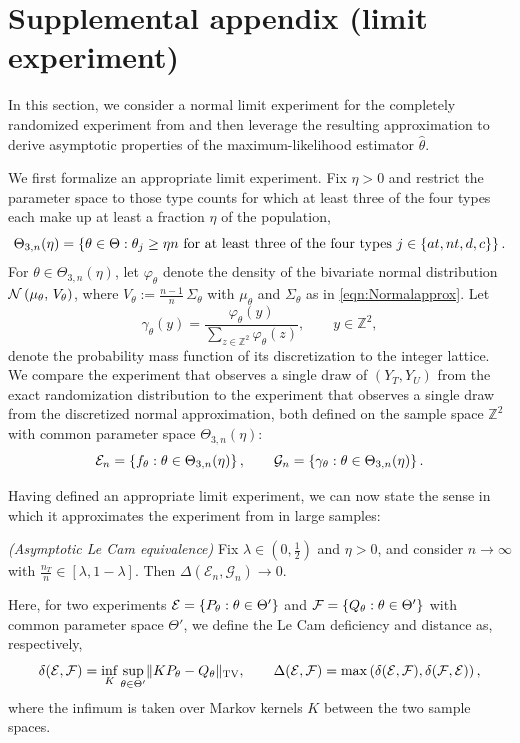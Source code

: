 \documentclass[12pt,reqno]{amsart}
\begin{document}
\newpage

\section{Supplemental appendix (limit experiment)}

In this section, we consider a normal limit experiment for the completely randomized experiment from  and then leverage the resulting approximation to derive asymptotic properties of the maximum-likelihood estimator $\hat{\theta}$.

We first formalize an appropriate limit experiment. 
Fix $\eta > 0$ and restrict the parameter space to those type counts for which at least three of the four types each make up at least a fraction $\eta$ of the population,
\[
    \Theta_{3,n}(\eta) = \left\{{\theta \in \Theta : \theta_j \geq \eta n \text{ for at least three of the four types } j \in \left\{{at, nt, d, c}\right\}}\right\}.
\]
For $\theta \in \Theta_{3,n}(\eta)$, let $\varphi_\theta$ denote the density of the bivariate normal distribution $\mathcal{N}\left(\mu_\theta,\, V_\theta\right)$, where $V_\theta := \tfrac{n-1}{n} \, \Sigma_\theta$ with $\mu_\theta$ and $\Sigma_\theta$ as in \eqref{eqn:Normalapprox}. Let
\[
    \gamma_\theta(y) = \frac{\varphi_\theta(y)}{\sum_{z \in \mathbb{Z}^2} \varphi_\theta(z)}, \qquad y \in \mathbb{Z}^2,
\]
denote the probability mass function of its discretization to the integer lattice. We compare the experiment that observes a single draw of $(Y_T, Y_U)$ from the exact randomization distribution to the experiment that observes a single draw from the discretized normal approximation, both defined on the sample space $\mathbb{Z}^2$ with common parameter space $\Theta_{3,n}(\eta)$:
\[
    \mathcal{E}_n = \left\{{f_\theta : \theta \in \Theta_{3,n}(\eta)}\right\},
    \qquad
    \mathcal{G}_n = \left\{{\gamma_\theta : \theta \in \Theta_{3,n}(\eta)}\right\}.
\]

Having defined an appropriate limit experiment, we can now state the sense in which it approximates the experiment from  in large samples:

\begin{prop}
\label{prop:lecam}
\emph{(Asymptotic Le Cam equivalence)}
Fix $\lambda \in (0, \tfrac{1}{2})$ and $\eta > 0$, and consider $n \rightarrow \infty$ with $\tfrac{n_T}{n} \in [\lambda, 1 - \lambda]$. Then
\(
    \Delta(\mathcal{E}_n, \mathcal{G}_n) \rightarrow 0.
\)
\end{prop}

Here, for two experiments $\mathcal{E} = \left\{{P_\theta : \theta \in \Theta'}\right\}$ and $\mathcal{F} = \left\{{Q_\theta : \theta \in \Theta'}\right\}$ with common parameter space $\Theta'$, we define the Le Cam deficiency and distance as, respectively,
\[
    \delta(\mathcal{E}, \mathcal{F}) = \inf_K \sup_{\theta \in \Theta'} \lVert K P_\theta - Q_\theta\rVert_{\mathrm{TV}},
    \qquad
    \Delta(\mathcal{E}, \mathcal{F}) = \max\left(\delta(\mathcal{E}, \mathcal{F}), \delta(\mathcal{F}, \mathcal{E})\right),
\]
where the infimum is taken over Markov kernels $K$ between the two sample spaces.
\end{document}
